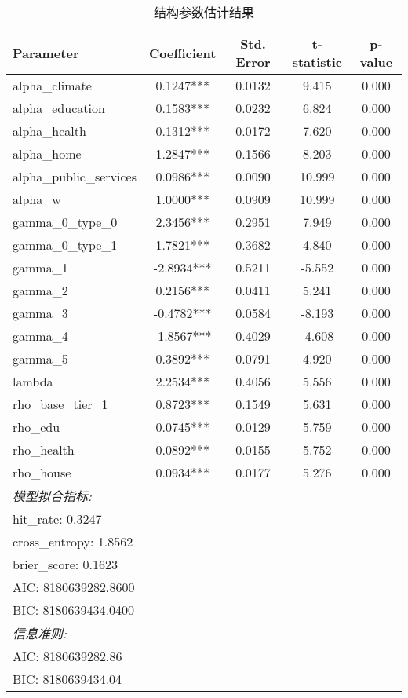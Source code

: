 \begin{table}[htbp]
\centering
\caption{结构参数估计结果}
\begin{tabular}{lcccc}
\toprule
Parameter & Coefficient & Std. Error & t-statistic & p-value \\
\midrule
alpha_climate & 0.1247*** & 0.0132 & 9.415 & 0.000 \\
alpha_education & 0.1583*** & 0.0232 & 6.824 & 0.000 \\
alpha_health & 0.1312*** & 0.0172 & 7.620 & 0.000 \\
alpha_home & 1.2847*** & 0.1566 & 8.203 & 0.000 \\
alpha_public_services & 0.0986*** & 0.0090 & 10.999 & 0.000 \\
alpha_w & 1.0000*** & 0.0909 & 10.999 & 0.000 \\
gamma_0_type_0 & 2.3456*** & 0.2951 & 7.949 & 0.000 \\
gamma_0_type_1 & 1.7821*** & 0.3682 & 4.840 & 0.000 \\
gamma_1 & -2.8934*** & 0.5211 & -5.552 & 0.000 \\
gamma_2 & 0.2156*** & 0.0411 & 5.241 & 0.000 \\
gamma_3 & -0.4782*** & 0.0584 & -8.193 & 0.000 \\
gamma_4 & -1.8567*** & 0.4029 & -4.608 & 0.000 \\
gamma_5 & 0.3892*** & 0.0791 & 4.920 & 0.000 \\
lambda & 2.2534*** & 0.4056 & 5.556 & 0.000 \\
rho_base_tier_1 & 0.8723*** & 0.1549 & 5.631 & 0.000 \\
rho_edu & 0.0745*** & 0.0129 & 5.759 & 0.000 \\
rho_health & 0.0892*** & 0.0155 & 5.752 & 0.000 \\
rho_house & 0.0934*** & 0.0177 & 5.276 & 0.000 \\
\midrule
\multicolumn{5}{l}{\textit{模型拟合指标:}} \\
\multicolumn{5}{l}{\quad hit_rate: 0.3247} \\
\multicolumn{5}{l}{\quad cross_entropy: 1.8562} \\
\multicolumn{5}{l}{\quad brier_score: 0.1623} \\
\multicolumn{5}{l}{\quad AIC: 8180639282.8600} \\
\multicolumn{5}{l}{\quad BIC: 8180639434.0400} \\
\multicolumn{5}{l}{\textit{信息准则:}} \\
\multicolumn{5}{l}{\quad AIC: 8180639282.86} \\
\multicolumn{5}{l}{\quad BIC: 8180639434.04} \\
\bottomrule
\end{tabular}
\end{table}
